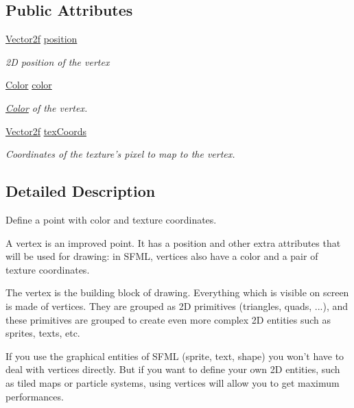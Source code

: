 \subsection*{Public Attributes}
\begin{DoxyCompactItemize}
\item 
\hyperlink{namespacesf_acf03098c2577b869e2fa6836cc48f1a0}{Vector2f} \hyperlink{classsf_1_1_vertex_a8a4e0f4dfa7f1eb215c92e93d04f0ac0}{position}
\begin{DoxyCompactList}\small\item\em 2\-D position of the vertex \end{DoxyCompactList}\item 
\hyperlink{classsf_1_1_color}{Color} \hyperlink{classsf_1_1_vertex_a799faa0629442e90f07cd2edb568ff80}{color}
\begin{DoxyCompactList}\small\item\em \hyperlink{classsf_1_1_color}{Color} of the vertex. \end{DoxyCompactList}\item 
\hyperlink{namespacesf_acf03098c2577b869e2fa6836cc48f1a0}{Vector2f} \hyperlink{classsf_1_1_vertex_a9e79bd05818d36c4789751908037097c}{tex\-Coords}
\begin{DoxyCompactList}\small\item\em Coordinates of the texture's pixel to map to the vertex. \end{DoxyCompactList}\end{DoxyCompactItemize}


\subsection{Detailed Description}
Define a point with color and texture coordinates. 

A vertex is an improved point. It has a position and other extra attributes that will be used for drawing\-: in S\-F\-M\-L, vertices also have a color and a pair of texture coordinates.

The vertex is the building block of drawing. Everything which is visible on screen is made of vertices. They are grouped as 2\-D primitives (triangles, quads, ...), and these primitives are grouped to create even more complex 2\-D entities such as sprites, texts, etc.

If you use the graphical entities of S\-F\-M\-L (sprite, text, shape) you won't have to deal with vertices directly. But if you want to define your own 2\-D entities, such as tiled maps or particle systems, using vertices will allow you to get maximum performances.

